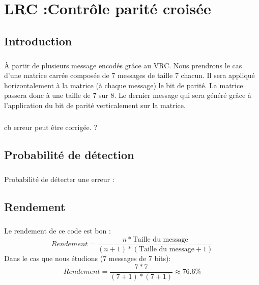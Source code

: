 
\chapter{LRC :Contrôle parité croisée}

    \section{Introduction}

        \paragraph{}
À partir de plusieurs message encodés grâce au VRC.
Nous prendrons le cas d'une matrice carrée composée de 7 messages de taille 7 chacun.
Il sera appliqué horizontalement à la matrice (à chaque message) le bit de parité.
La matrice passera donc à une taille de 7 sur 8.
Le dernier message qui sera généré grâce à l'application du bit de parité verticalement sur la matrice.
        \paragraph{}
cb erreur peut être corrigée. ?


    \section{Probabilité de détection}

        \paragraph{}
Probabilité de détecter une erreur :


    \section{Rendement}

        \paragraph{}
Le rendement de ce code est bon :
\[  Rendement = \frac{n*\text{Taille du message}}{(n+1)*(\text{Taille du message}+1)} \]
Dans le cas que nous étudions (7 messages de 7 bits):
\[  Rendement = \frac{7*7}{(7+1)*(7+1)} \approx 76.6\% \]
